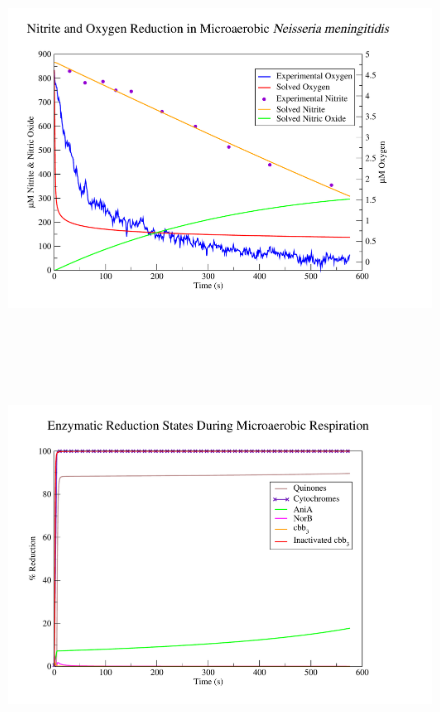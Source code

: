 \begin{figure}[t]
 \centering
 \includegraphics[height=10cm, trim=1cm 1cm 3cm 1cm, clip=true]{./07-nitritereduction/data/dataset1-1.pdf}
\end{figure}
\begin{figure}[b]
 \centering
 \includegraphics[height=10cm, trim=1cm 1cm 3cm 1cm, clip=true]{./07-nitritereduction/data/dataset1redox-1.pdf}
\end{figure}

